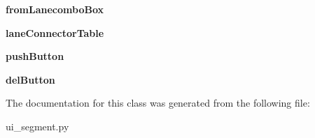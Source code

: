 \begin{DoxyCompactItemize}
\item 
\hypertarget{class_sim_g_d_c_1_1ui__segment_1_1_ui___segment_a30e4b39e3c4f894ebe6cea0365365911}{}{\bfseries from\+Lanecombo\+Box}\label{class_sim_g_d_c_1_1ui__segment_1_1_ui___segment_a30e4b39e3c4f894ebe6cea0365365911}

\item 
\hypertarget{class_sim_g_d_c_1_1ui__segment_1_1_ui___segment_a8ba8e1128c9e98f2fcbdaf7ae7a3aa10}{}{\bfseries lane\+Connector\+Table}\label{class_sim_g_d_c_1_1ui__segment_1_1_ui___segment_a8ba8e1128c9e98f2fcbdaf7ae7a3aa10}

\item 
\hypertarget{class_sim_g_d_c_1_1ui__segment_1_1_ui___segment_a112e02977aa48e42e37048ca079ca45e}{}{\bfseries push\+Button}\label{class_sim_g_d_c_1_1ui__segment_1_1_ui___segment_a112e02977aa48e42e37048ca079ca45e}

\item 
\hypertarget{class_sim_g_d_c_1_1ui__segment_1_1_ui___segment_acffb4bcabe5bb5cecb280f0576f33b2f}{}{\bfseries del\+Button}\label{class_sim_g_d_c_1_1ui__segment_1_1_ui___segment_acffb4bcabe5bb5cecb280f0576f33b2f}

\end{DoxyCompactItemize}


The documentation for this class was generated from the following file\+:\begin{DoxyCompactItemize}
\item 
ui\+\_\+segment.\+py\end{DoxyCompactItemize}
